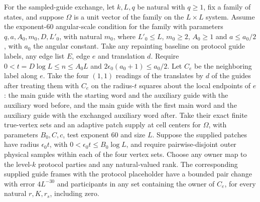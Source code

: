 \begin{lemma}
    \label{thm:peps_protocol_lens_exchange_change}
    \leanok
    For the sampled-guide exchange, let $k,L,q$ be natural with $q\ge1$,
    fix a family of states, and suppose $\Omega$ is a unit vector of the
    family on the $L\times L$ system. Assume the exponent-$60$ angular-scale
    condition for the family with parameters $q,a,A_0,m_0,D,L'_0$, with natural $m_0$, where
    $L'_0\le L$, $m_0\ge2$, $A_0\ge1$ and $a\le a_0/2$, with $a_0$ the angular
    constant. Take any repainting baseline on protocol guide labels, any
    edge list $E$, edge $e$ and translation $d$. Require
    $0<t=D\log L\le n\le A_0L$ and
    $2\epsilon_0(a_0+1)\le a_0/2$.
    Let $C_e$ be the neighboring label along $e$. Take the four $(1,1)$
    readings of the translates by $d$ of the guides after treating them
    with $C_e$ on the radius-$t$ squares about the local endpoints of $e$:
    the main guide with the starting word and the auxiliary guide with the auxiliary word before, and the main guide
    with the first main word and the auxiliary guide with the exchanged
    auxiliary word after. Take their exact finite true-vertex sets and
    an adaptive patch supply at cell centers for $\Omega$, with parameters
    $B_0,C,c$, test exponent $60$ and size $L$. Suppose
    the supplied patches have radius $\epsilon_0t$, with
    $0<\epsilon_0t\le B_0\log L$, and require pairwise-disjoint outer
    physical samples within each of the four vertex sets. Choose
    any owner map to the level-$k$ protocol parties and any natural-valued
    rank. The corresponding supplied guide frames with the protocol
    placeholder have a bounded pair change with error $4L^{-30}$ and
    participants in any set containing the owner of $C_e$, for every
    natural $r,K,r_s$, including zero.


\end{lemma}
